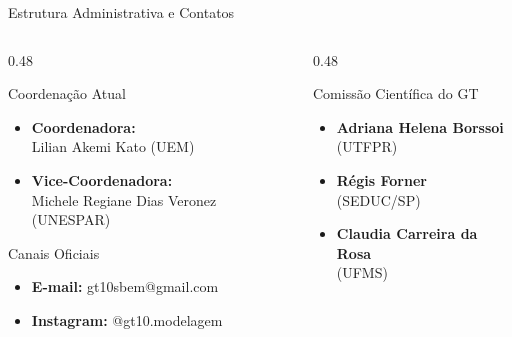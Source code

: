 \documentclass[10pt, aspectratio=169]{beamer}
\begin{document}
\begin{frame}{Estrutura Administrativa e Contatos}
    \transwipe[direction=0, duration=0.4]
    \begin{columns}[T]
        \begin{column}{0.48\textwidth}
            \begin{block}{Coordenação Atual}
                \begin{itemize}
                    \item \textbf{Coordenadora:} \\ Lilian Akemi Kato (UEM)
                    \pause
                    \item \textbf{Vice-Coordenadora:} \\ Michele Regiane Dias Veronez (UNESPAR)
                \end{itemize}
            \end{block}
            \pause
            \begin{alertblock}{Canais Oficiais}
                \begin{itemize}
                    \item \textbf{E-mail:} gt10sbem@gmail.com
                    \item \textbf{Instagram:} @gt10.modelagem
                \end{itemize}
            \end{alertblock}
        \end{column}
        \begin{column}{0.48\textwidth}
            \begin{exampleblock}{Comissão Científica do GT}
                \begin{itemize}
                    \item \textbf{Adriana Helena Borssoi} \\ (UTFPR)
                    \item \textbf{Régis Forner} \\ (SEDUC/SP)
                    \item \textbf{Claudia Carreira da Rosa} \\ (UFMS)
                \end{itemize}
            \end{exampleblock}
        \end{column}
    \end{columns}
\end{frame}
\end{document}
